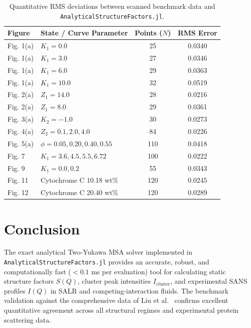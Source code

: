 \documentclass[11pt,a4paper]{article}
\begin{document}
\begin{table}[H]
\centering
\caption{Quantitative RMS deviations between scanned benchmark data and \texttt{AnalyticalStructureFactors.jl}.}
\label{tab:benchmarks}
\begin{tabular}{llcc}
\toprule
\textbf{Figure} & \textbf{State / Curve Parameter} & \textbf{Points ($N$)} & \textbf{RMS Error} \\
\midrule
Fig. 1(a) & $K_1 = 0.0$ & 25 & 0.0340 \\
Fig. 1(a) & $K_1 = 3.0$ & 27 & 0.0346 \\
Fig. 1(a) & $K_1 = 6.0$ & 29 & 0.0363 \\
Fig. 1(a) & $K_1 = 10.0$ & 32 & 0.0519 \\
Fig. 2(a) & $Z_1 = 14.0$ & 28 & 0.0216 \\
Fig. 2(a) & $Z_1 = 8.0$ & 29 & 0.0361 \\
Fig. 3(a) & $K_2 = -1.0$ & 30 & 0.0273 \\
Fig. 4(a) & $Z_2 = 0.1, 2.0, 4.0$ & 84 & 0.0226 \\
Fig. 5(a) & $\phi = 0.05, 0.20, 0.40, 0.55$ & 110 & 0.0418 \\
Fig. 7 & $K_1 = 3.6, 4.5, 5.5, 6.72$ & 100 & 0.0222 \\
Fig. 9 & $K_1 = 0.0, 0.2$ & 55 & 0.0343 \\
Fig. 11 & Cytochrome C 10.18 wt\% & 120 & 0.0245 \\
Fig. 12 & Cytochrome C 20.40 wt\% & 120 & 0.0289 \\
\bottomrule
\end{tabular}
\end{table}

\section{Conclusion}

The exact analytical Two-Yukawa MSA solver implemented in \texttt{Analytical\-Structure\-Factors.jl} provides an accurate, robust, and computationally fast ($< 0.1$ ms per evaluation) tool for calculating static structure factors $S(Q)$, cluster peak intensities $I_{\text{cluster}}$, and experimental SANS profiles $I(Q)$ in SALR and competing-interaction fluids. The benchmark validation against the comprehensive data of Liu et al.~\cite{liu2005cluster} confirms excellent quantitative agreement across all structural regimes and experimental protein scattering data.
\end{document}
